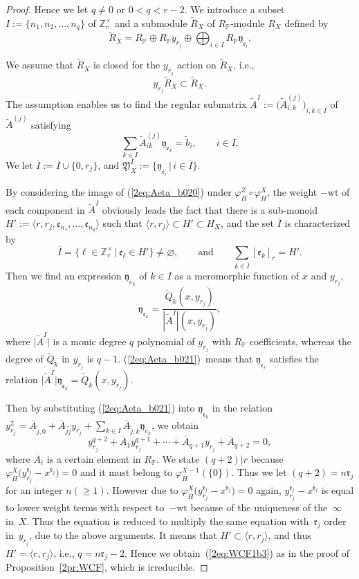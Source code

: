 \documentclass[pdftex]{sigma}
\def\ZZ{{\mathbb Z}}
\def\PP{{\mathbb P}}
\def\fY{{\mathfrak Y}}
\def\fe{{\mathfrak e}}
\def\fr{{\mathfrak r}}
\def\fy{{\mathfrak y}}
\def\tA{{\widetilde A}}
\def\tR{{\widetilde R}}
\def\tQ{{\widetilde Q}}
\def\tR{{\widetilde R}}
\def\tb{{\widetilde b}}
\def\tj{{\widetilde j}}
\def\BA{{\overline A}}
\def\BI{{\overline I}}
\def\Bfr{{\overline{\mathfrak r}}}
\def\wt{{\mathrm {wt}}}
\numberwithin{equation}{section}
\begin{document}
\begin{proof}
Hence we let $q\neq0$ or $0<q<r-2$.
We introduce a subset $I:=\{n_1, n_2, \dots, n_q\}$ of $\ZZ_r^\times$ and a submodule $\tR_X$ of $R_\PP$-module $R_X$ defined by
\[
\tR_X=R_\PP \oplus R_\PP y_{r_j}\oplus\bigoplus_{i \in I}R_\PP \fy_{\fe_i}.
\]

We assume that $\tR_X$ is closed for the $y_{r_j}$ action on $\tR_X$, i.e.,
\begin{equation}
y_{r_j}\tR_X\subset \tR_X.\label{2eq:Aeta_b03}
\end{equation}
The assumption enables us to find the regular submatrix $\tA^{I}:=\big(\tA^{(j)}_{i,k}\big)_{i, k\in I}$ of $\tA^{(j)}$ satisfying
\begin{equation}
\sum_{k \in I} \tA^{(j)}_{i k}\fy_{\fe_k} =\tb_i, \qquad i \in I.\label{2eq:Aeta_b020}
\end{equation}
We let $\BI:=I\cup\{0,r_j\}$, and $\fY_X^\BI:=\big\{ \fy_{\fe_i}\, |\,i \in \BI\big\}$.

By considering the image of (\ref{2eq:Aeta_b020}) under $\varphi_H^Z\circ\varphi_H^X$, the weight $-\wt$ of each component in $\tA^I$ obviously leads the fact that there is a sub-monoid $H':=\langle r, r_j, \fe_{n_1}, \dots, \fe_{n_q}\rangle$ such that $\langle r, r_j\rangle \subset H' \subset H_X$, and the set $\BI$ is characterized by
\begin{equation}
\BI = \{\ell \in \ZZ_r^\times \, |\,\fe_{\ell}\in H'\}\neq \varnothing, \qquad\text{and}\qquad
 \sum_{k\in \BI} [\fe_{k}]_r = H'.\label{2eq:Aeta_b022}
\end{equation}
Then we find an expression $\fy_{e_{k}}$ of $k \in I$ as a meromorphic function of $x$ and $y_{r_j}$,
\begin{equation}
\fy_{\fe_{k}}= \frac{\tQ_k(x, y_{r_j}) } {|\tA^{I}|(x, y_{r_j})},\label{2eq:Aeta_b021}
\end{equation}
where $\big|\tA^{I}\big|$ is a monic degree $q$ polynomial of $y_{r_j}$ with $R_\PP$ coefficients, whereas the degree of $\tQ_k$ in $y_{r_j}$ is $q-1$.
(\ref{2eq:Aeta_b021})~means that $\fy_{\fe_{\ell}}$ satisfies the relation $\big|\tA^{I}\big|\fy_{\fe_{k}}=\tQ_k(x, y_{r_j})$.

Then by substituting (\ref{2eq:Aeta_b021}) into $\fy_{\fe_{k}}$ in the relation
$y_{r_j}^2= \BA_{\tj,0}+\BA_{\tj\tj}y_{r_j}+ \sum_{k\in I} \BA_{\tj,k} \fy_{e_k}$, we obtain
\[
y_{r_j}^{q+2} + \BA_{1}y_{r_j}^{q+1}+\cdots+ \BA_{q+1}y_{r_j}+\BA_{q+2}=0,
\]
where $\BA_i$ is a certain element in $R_\PP$.
We state $(q+2)|r$ because $\varphi_H^X\big(y_{r_j}^{\fr_j}-x^{\Bfr_j}\big)=0$ and it must belong to $\varphi_H^{X-1}(\{0\})$. Thus we let $(q+2) = n\fr_j$ for an integer $n(\ge 1)$. However due to $\varphi_H^X\big(y_{r_j}^{\fr_j}-x^{\Bfr_j}\big)=0$ again, $y_{r_j}^{\fr_j}-x^{\Bfr_j}$ is equal to lower weight terms with respect to~$-\wt$ because of the uniqueness of the~$\infty$ in~$X$.
Thus the equation is reduced to multiply the same equation with~$\fr_j$ order in~$y_{r_j}$, due to the above arguments.
It means that $H'\subset \langle r, r_j\rangle$, and thus $H'=\langle r, r_j\rangle$, i.e., $q=n\fr_j-2$.
Hence we obtain~(\ref{2eq:WCF1b3}) as in the proof of Proposition~\ref{2pr:WCF}, which is irreducible.


\end{proof}
\end{document}
